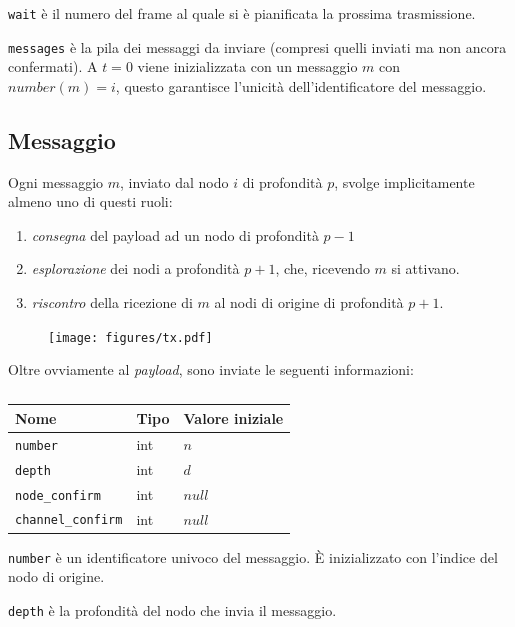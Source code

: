 \documentclass[a4paper,12pt]{article}
\theoremstyle{definition}
\begin{document}
\texttt{wait} è il numero del frame al quale si è pianificata la prossima trasmissione.

\texttt{messages} è la pila dei messaggi da inviare (compresi quelli inviati ma non ancora confermati). A $t=0$ viene inizializzata con un messaggio $m$ con $number(m) = i$, questo garantisce l'unicità dell'identificatore del messaggio.

\subsection{Messaggio}

Ogni messaggio $m$, inviato dal nodo $i$ di profondità $p$, svolge implicitamente almeno uno di questi ruoli:

\begin{enumerate}
\item \emph{consegna} del payload ad un nodo di profondità $p-1$
\item \emph{esplorazione} dei nodi a profondità $p+1$, che, ricevendo $m$ si attivano.
\item \emph{riscontro} della ricezione di $m$ al nodi di origine di profondità $p+1$.
\end{enumerate}

\begin{figure}[H]
\centering
\texttt{[image: figures/tx.pdf]}
\caption{}
\end{figure}

Oltre ovviamente al \emph{payload}, sono inviate le seguenti informazioni:

\begin{table}[H]
\centering
\begin{tabular}{| l | l | l |}
\multicolumn{1}{l}{Nome} &
\multicolumn{1}{l}{Tipo} &
\multicolumn{1}{l}{Valore iniziale} \\ \hline
\texttt{number} & int & $n$ \\ \hline
\texttt{depth} & int & $d$ \\ \hline
\texttt{node\_confirm} & int & $null$ \\ \hline
\texttt{channel\_confirm} & int & $null$ \\ \hline
\end{tabular}
\caption{}
\end{table}

\texttt{number} è un identificatore univoco del messaggio. È inizializzato con l'indice del nodo di origine.

\texttt{depth} è la profondità del nodo che invia il messaggio.
\end{document}
